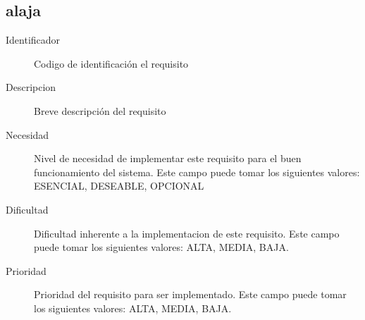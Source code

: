 \subsection{alaja}
\begin{description}
    \item[Identificador] Codigo de identificación el requisito
    \item[Descripcion] Breve descripción del requisito
    \item[Necesidad] Nivel de necesidad de implementar este requisito para el buen funcionamiento del sistema. Este campo puede tomar los siguientes valores: ESENCIAL, DESEABLE, OPCIONAL
    \item[Dificultad] Dificultad inherente a la implementacion de este requisito. Este campo puede tomar los siguientes valores: ALTA, MEDIA, BAJA.
    \item[Prioridad] Prioridad del requisito para ser implementado. Este campo puede tomar los siguientes valores: ALTA, MEDIA, BAJA.
\end{description}